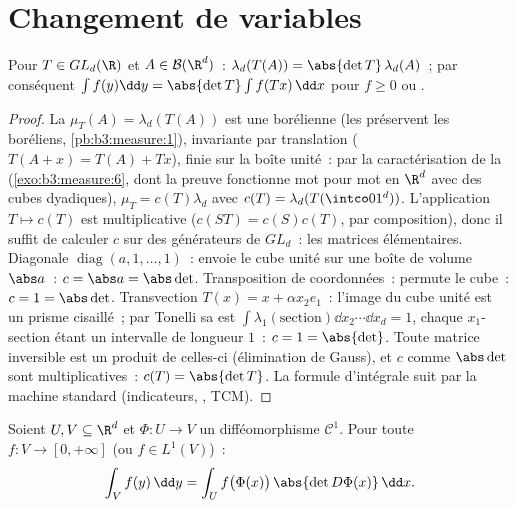 \section{Changement de variables}

\begin{theorem}
\label{thm:b3:product:linearchange}
Pour $T \in GL_d(\R)$ et $A \in \mathcal B(\R^d)$~:
$\lambda_d(T(A)) = \abs{\det T}\,\lambda_d(A)$~; par
conséquent $\int f(y)\dd y = \abs{\det T}\int f(Tx)\,\dd x$
pour $f \geq 0$ ou .
\end{theorem}

\begin{proof}
La  $\mu_T(A) = \lambda_d(T(A))$ est une 
borélienne (les  préservent les boréliens,
\cref{pb:b3:measure:1}), invariante par translation
($T(A + x) = T(A) + Tx$), finie sur la boîte unité~: par la
caractérisation de la 
(\cref{exo:b3:measure:6}, dont la preuve fonctionne
mot pour mot en $\R^d$ avec des cubes dyadiques), $\mu_T =
c(T)\lambda_d$ avec $c(T) = \lambda_d(T(\intco01^d))$.
L'application $T \mapsto c(T)$ est multiplicative ($c(ST) =
c(S)c(T)$, par composition), donc il suffit de calculer $c$
sur des générateurs de $GL_d$~: les matrices élémentaires.
Diagonale $\operatorname{diag}(a, 1, \dots, 1)$~: envoie le
cube unité sur une boîte de volume $\abs a$~: $c = \abs a =
\abs\det$. Transposition de coordonnées~: permute le cube~:
$c = 1 = \abs\det$. Transvection $T(x) = x + \alpha
x_2e_1$~: l'image du cube unité est un prisme cisaillé~; par
Tonelli sa  est $\int\lambda_1(\text{section})\dd x_2
\cdots \dd x_d = 1$, chaque $x_1$-section étant un intervalle
de longueur $1$~: $c = 1 = \abs{\det}$. Toute matrice
inversible est un produit de celles-ci (élimination de
Gauss), et $c$ comme $\abs\det$ sont multiplicatives~:
$c(T) = \abs{\det T}$. La formule d'intégrale suit par la
machine standard (indicateurs, , TCM).
\end{proof}

\begin{theorem}\label{thm:b3:product:changeofvar}
Soient $U, V \subseteq \R^d$  et $\Phi \colon U \to V$
un difféomorphisme $\mathcal C^1$. Pour toute $f \colon V
\to [0, +\infty]$  (ou $f \in L^1(V)$)~:
\[
\int_V f(y)\,\dd y = \int_U
f\bigl(\Phi(x)\bigr)\,\abs{\det D\Phi(x)}\,\dd x .
\]
\end{theorem}

